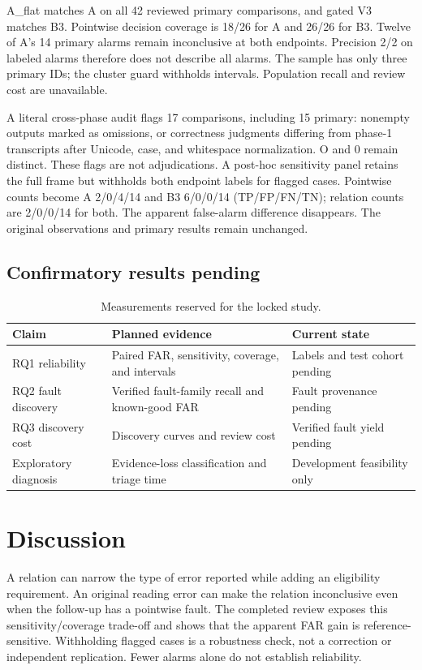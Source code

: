 \documentclass[sigconf,review,anonymous]{acmart}
\begin{document}
A\_flat matches A on all 42 reviewed primary comparisons, and gated V3 matches B3. Pointwise decision coverage is 18/26 for A and 26/26 for B3. Twelve of A's 14 primary alarms remain inconclusive at both endpoints. Precision 2/2 on labeled alarms therefore does not describe all alarms. The sample has only three primary IDs; the cluster guard withholds intervals. Population recall and review cost are unavailable.

A literal cross-phase audit flags 17 comparisons, including 15 primary: nonempty outputs marked as omissions, or correctness judgments differing from phase-1 transcripts after Unicode, case, and whitespace normalization. O and 0 remain distinct. These flags are not adjudications. A post-hoc sensitivity panel retains the full frame but withholds both endpoint labels for flagged cases. Pointwise counts become A 2/0/4/14 and B3 6/0/0/14 (TP/FP/FN/TN); relation counts are 2/0/0/14 for both. The apparent false-alarm difference disappears. The original observations and primary results remain unchanged.

\subsection{Confirmatory results pending}
\begin{table}[t]
\centering
\caption{Measurements reserved for the locked study.}
\label{tab:pending}
\begin{tabular}{@{}lll@{}}
\toprule
Claim & Planned evidence & Current state\\
\midrule
RQ1 reliability & Paired FAR, sensitivity, coverage, and intervals & Labels and test cohort pending\\
RQ2 fault discovery & Verified fault-family recall and known-good FAR & Fault provenance pending\\
RQ3 discovery cost & Discovery curves and review cost & Verified fault yield pending\\
Exploratory diagnosis & Evidence-loss classification and triage time & Development feasibility only\\
\bottomrule
\end{tabular}
\end{table}

\section{Discussion}
A relation can narrow the type of error reported while adding an eligibility requirement. An original reading error can make the relation inconclusive even when the follow-up has a pointwise fault. The completed review exposes this sensitivity/coverage trade-off and shows that the apparent FAR gain is reference-sensitive. Withholding flagged cases is a robustness check, not a correction or independent replication. Fewer alarms alone do not establish reliability.
\end{document}
